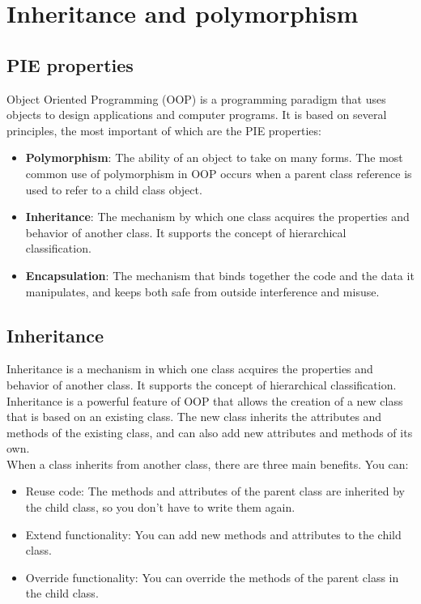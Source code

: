 \chapter{Inheritance and polymorphism}

\section{PIE properties}

Object Oriented Programming (OOP) is a programming paradigm that uses objects to design 
applications and computer programs. It is based on several principles, the most important 
of which are the PIE properties:

\begin{itemize}
    \item \textbf{Polymorphism}: The ability of an object to take on many forms. The most 
    common use of polymorphism in OOP occurs when a parent class reference is used to refer 
    to a child class object.
    \item \textbf{Inheritance}: The mechanism by which one class acquires the properties and 
    behavior of another class. It supports the concept of hierarchical classification.
    \item \textbf{Encapsulation}: The mechanism that binds together the code and the data it 
    manipulates, and keeps both safe from outside interference and misuse.
\end{itemize}

\section{Inheritance}

Inheritance is a mechanism in which one class acquires the properties and behavior of 
another class. It supports the concept of hierarchical classification. Inheritance is 
a powerful feature of OOP that allows the creation of a new class that is based on an
existing class. The new class inherits the attributes and methods of the existing class,
and can also add new attributes and methods of its own.\\

When a class inherits from another class, there are three main benefits. You can:

\begin{itemize}
    \item Reuse code: The methods and attributes of the parent class are inherited by the 
    child class, so you don't have to write them again.
    \item Extend functionality: You can add new methods and attributes to the child class.
    \item Override functionality: You can override the methods of the parent class in the 
    child class.
\end{itemize}

